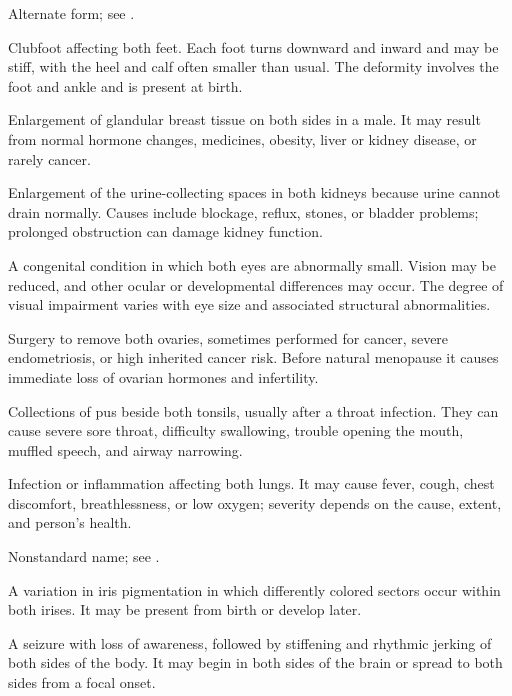  Alternate form; see .

 Clubfoot affecting both feet. Each foot turns
downward and inward and may be stiff, with the heel and calf often smaller than
usual. The deformity involves the foot and ankle and is present at birth.

 Enlargement of glandular breast tissue on both sides in a male. It may result from normal hormone changes, medicines, obesity, liver or kidney disease, or rarely cancer.

 Enlargement of the urine-collecting spaces in both kidneys because urine cannot drain normally. Causes include blockage, reflux, stones, or bladder problems; prolonged obstruction can damage kidney function.

 A congenital condition in which both eyes
are abnormally small. Vision may be reduced, and other ocular or developmental
differences may occur. The degree of visual impairment varies with eye size
and associated structural abnormalities.

 Surgery to remove both ovaries, sometimes performed for cancer, severe endometriosis, or high inherited cancer risk. Before natural menopause it causes immediate loss of ovarian hormones and infertility.

 Collections of pus beside both tonsils, usually after a throat infection. They can cause severe sore throat, difficulty swallowing, trouble opening the mouth, muffled speech, and airway narrowing.

 Infection or inflammation affecting both lungs. It may cause fever, cough, chest discomfort, breathlessness, or low oxygen; severity depends on the cause, extent, and person's health.

 Nonstandard name; see .

 A variation in iris pigmentation in which differently colored sectors occur within both irises. It may be present from birth or develop later.

 A seizure with loss of awareness, followed by stiffening and rhythmic jerking of both sides of the body. It may begin in both sides of the brain or spread to both sides from a focal onset.

